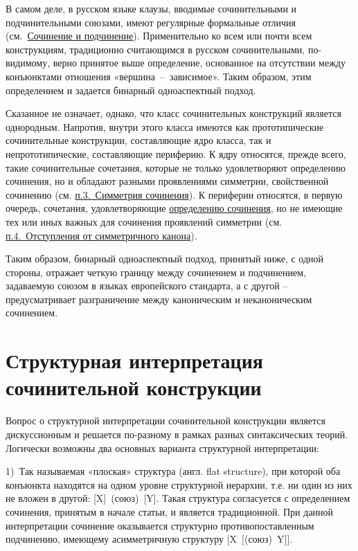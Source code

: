 В самом деле, в русском языке клаузы, вводимые сочинительными и
подчинительными союзами, имеют регулярные формальные отличия
(см.~\underline{Сочинение и подчинение}). Применительно ко всем или
почти всем конструкциям, традиционно считающимся в русском
сочинительными, по-видимому, верно принятое выше определение, основанное
на отсутствии между конъюнктами отношения «вершина~--~зависимое». Таким
образом, этим определением и задается бинарный одноаспектный подход.

Сказанное не означает, однако, что класс сочинительных конструкций
является однородным. Напротив, внутри этого класса имеются как
прототипические сочинительные конструкции, составляющие ядро класса, так
и непрототипические, составляющие периферию. К ядру относятся, прежде
всего, такие сочинительные сочетания, которые не только удовлетворяют
определению сочинения, но и обладают разными проявлениями симметрии,
свойственной сочинению (см. \underline{п.3.~Симметрия сочинения}). К
периферии относятся, в первую очередь, сочетания, удовлетворяющие
\underline{определению сочинения}, но не имеющие тех или иных важных для
сочинения проявлений симметрии (см. \underline{п.4.~Отступления от
симметричного канона}).

Таким образом, бинарный одноаспектный подход, принятый ниже, с одной
стороны, отражает четкую границу между сочинением и подчинением,
задаваемую союзом в языках европейского стандарта, а с другой --
предусматривает разграничение между каноническим и неканоническим
сочинением.

\section{Структурная интерпретация сочинительной
конструкции}\label{ux441ux442ux440ux443ux43aux442ux443ux440ux43dux430ux44f-ux438ux43dux442ux435ux440ux43fux440ux435ux442ux430ux446ux438ux44f-ux441ux43eux447ux438ux43dux438ux442ux435ux43bux44cux43dux43eux439-ux43aux43eux43dux441ux442ux440ux443ux43aux446ux438ux438}

Вопрос о структурной интерпретации сочинительной конструкции является
дискуссионным и решается по-разному в рамках разных синтаксических
теорий. Логически возможны два основных варианта структурной
интерпретации:

1)~Так называемая «плоская» структура (англ. flat structure), при
которой оба конъюнкта находятся на одном уровне структурной иерархии,
т.е. ни один из них не вложен в другой: {[}X{]}~(союз)~{[}Y{]}. Такая
структура согласуется с определением сочинения, принятым в начале
статьи, и является традиционной. При данной интерпретации сочинение
оказывается структурно противопоставленным подчинению, имеющему
асимметричную структуру {[}X~{[}(союз)~Y{]}{]}.

